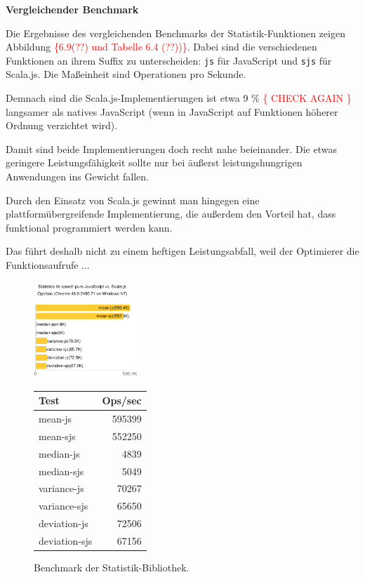 \documentclass[a4paper, 12pt, hidelinks, listof=totoc, listoftables=totoc, bibliography=totoc]{scrreprt}
\newcommand{\code}[1]{\lstinline[language=Scala, style=inline]|#1|}
\newcommand{\TODOi}[1]{\textcolor{red}{\{#1\}}}
\newcommand{\MyMiniSec}[1]{\rmfamily\fontsize{12}{15}\selectfont
	\vspace{7pt}\textbf{#1} %
}
\begin{document}
\MyMiniSec{Vergleichender Benchmark}

Die Ergebnisse des vergleichenden Benchmarks der Statistik-Funktionen zeigen Abbildung \TODOi{6.9(??) und Tabelle 6.4 (??))}. Dabei sind die verschiedenen Funktionen an ihrem Suffix zu unterscheiden: \code{js} für JavaScript und \code{sjs} für Scala.js. Die Maßeinheit sind Operationen pro Sekunde.

Demnach sind die Scala.js-Implementierungen ist etwa 9 \% \TODOi{ CHECK AGAIN } langsamer als natives JavaScript (wenn in JavaScript auf Funktionen höherer Ordnung verzichtet wird).

Damit sind beide Implementierungen doch recht nahe beieinander. Die etwas geringere Leistungsfähigkeit sollte nur bei äußerst leistungshungrigen Anwendungen ins Gewicht fallen.

Durch den Einsatz von Scala.js gewinnt man hingegen eine plattformübergreifende Implementierung, die außerdem den Vorteil hat, dass funktional programmiert werden kann.

Das führt deshalb nicht zu einem heftigen Leistungsabfall, weil der Optimierer die Funktionsaufrufe ...

\begin{figure}[!h]
	\centering
	\includegraphics[width=0.35\textwidth]{statistics-lib/benchmark-statistics-lib-chart}
	\qquad
	\qquad
	\begin{tabular}[b]{|l|r|}
		\hline \textbf{Test} & \textbf{Ops/sec} \\ 
		\hline mean-js       & 595399 \\ 
		\hline mean-sjs      & 552250 \\ 
		\hline median-js     & 4839 \\ 
		\hline median-sjs    & 5049 \\ 
		\hline variance-js   & 70267 \\ 
		\hline variance-sjs  & 65650 \\ 
		\hline deviation-js  & 72506 \\ 
		\hline deviation-sjs & 67156 \\ 
		\hline 
	\end{tabular}
	\captionsetup{labelformat=andtable}
	\caption{Benchmark der Statistik-Bibliothek.}
\end{figure}
\end{document}

